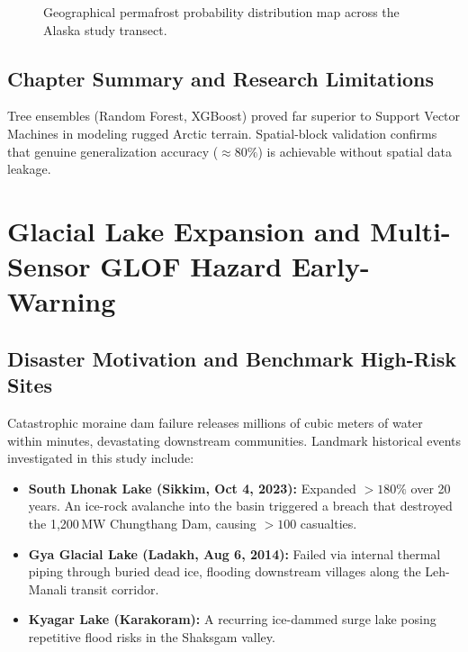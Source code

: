\documentclass[12pt,a4paper]{report}
\begin{document}
\begin{figure}[H]
\centering
\caption{Geographical permafrost probability distribution map across the Alaska study transect.}
\label{fig:permafrost_probability_map}
\end{figure}

\section{Chapter Summary and Research Limitations}
Tree ensembles (Random Forest, XGBoost) proved far superior to Support Vector Machines in modeling rugged Arctic terrain. Spatial-block validation confirms that genuine generalization accuracy ($\approx 80\%$) is achievable without spatial data leakage.


\chapter{Glacial Lake Expansion and Multi-Sensor GLOF Hazard Early-Warning}

\section{Disaster Motivation and Benchmark High-Risk Sites}
Catastrophic moraine dam failure releases millions of cubic meters of water within minutes, devastating downstream communities. Landmark historical events investigated in this study include:
\begin{itemize}
    \item \textbf{South Lhonak Lake (Sikkim, Oct 4, 2023):} Expanded $>180\%$ over 20 years. An ice-rock avalanche into the basin triggered a breach that destroyed the 1,200\,MW Chungthang Dam, causing $>100$ casualties.
    \item \textbf{Gya Glacial Lake (Ladakh, Aug 6, 2014):} Failed via internal thermal piping through buried dead ice, flooding downstream villages along the Leh-Manali transit corridor.
    \item \textbf{Kyagar Lake (Karakoram):} A recurring ice-dammed surge lake posing repetitive flood risks in the Shaksgam valley.
\end{itemize}
\end{document}
